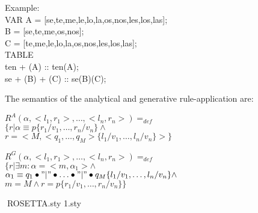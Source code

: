 \small
\begin{code}
Example: \\
\>VAR
\>\>A = [se,te,me,le,lo,la,os,nos,les,los,las];\\
\>\>B = [se,te,me,os,nos];\\
\>\>C = [te,me,le,lo,la,os,nos,les,los,las];\\
\>TABLE\\
\>\>ten + (A) :: ten(A);\\
\>\>se  + (B) + (C) :: se(B)(C);\\
\end{code}
\normalsize

The semantics of the analytical and generative rule-application are:
\small
\begin{code}
$R^{A}(\alpha,<l_{1},r_{1}>, \ldots ,<l_{n},r_{n}>) =_{def}$\\
\>$\{ r | \alpha \equiv p\{r_{1}/v_{1},\ldots,r_{n}/v_{n}\} \wedge$\\
\>$r = <M, <q_{1},\ldots,q_{M}>\{l_{1}/v_{1},\ldots,l_{n}/v_{n}\}> \}$\\
\end{code}
\normalsize
\small
\begin{code}
$R^{G}(\alpha,<l_{1},r_{1}>, \ldots ,<l_{n},r_{n}>) =_{def}$\\
\>$\{ r | \exists m : \alpha = <m, \alpha_{1}> \wedge$\\
\>$\alpha_{1} \equiv q_{1}\bullet"|"\bullet\ldots\bullet "|"\bullet q_{M}\{l_{1}/v_{1},\ldots,l_{n}/v_{n}\} \wedge$\\
\>$m= M \wedge r = p\{r_{1}/v_{1},\ldots,r_{n}/v_{n}\} \}$\\
\end{code}
\normalsize


ROSETTA.sty
\def\@ptsize{1}
\@namedef{ds@10pt}{\def\@ptsize{0}}
\@namedef{ds@12pt}{\def\@ptsize{2}}
\@twosidetrue
\@mparswitchtrue
\def\ds@draft{\overfullrule 5pt}
\@options
\@ptsize.sty\relax


